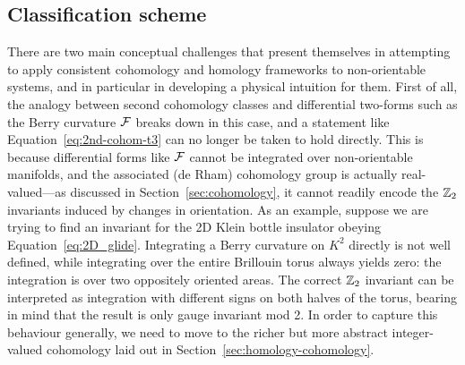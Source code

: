 \subsection{Classification scheme}\label{sec:formalism}

There are two main conceptual challenges that present themselves in attempting to apply consistent cohomology and homology frameworks to non-orientable systems, and in particular in developing a physical intuition for them. First of all, the analogy between second cohomology classes and differential two-forms such as the Berry curvature $\mathcal{F}$ breaks down in this case, and a statement like Equation~\eqref{eq:2nd-cohom-t3} can no longer be taken to hold directly. This is because differential forms like $\mathcal{F}$ cannot be integrated over non-orientable manifolds, and the associated (de Rham) cohomology group is actually real-valued---as discussed in Section~\ref{sec:cohomology}, it cannot readily encode the $\mathbb{Z}_2$ invariants induced by changes in orientation. As an example, suppose we are trying to find an invariant for the 2D Klein bottle insulator obeying Equation~\eqref{eq:2D_glide}. Integrating a Berry curvature on $K^2$ directly is not well defined, while integrating over the entire Brillouin torus always yields zero: the integration is over two oppositely oriented areas. The correct $\mathbb{Z}_2$ invariant can be interpreted as integration with different signs on both halves of the torus, bearing in mind that the result is only gauge invariant mod 2. In order to capture this behaviour generally, we need to move to the richer but more abstract integer-valued cohomology laid out in Section~\ref{sec:homology-cohomology}.

